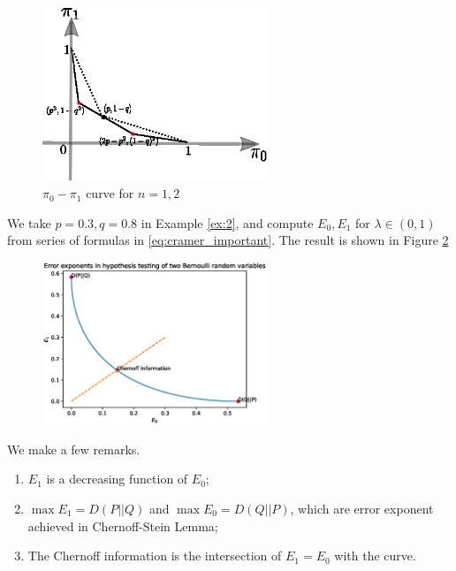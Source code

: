 \documentclass{article}
\begin{document}
\begin{figure}[!ht]
    \centering
    \includegraphics[width=0.6\textwidth]{pi0pi1_bern_2.eps}
    \caption{$\pi_0-\pi_1$ curve for $n=1,2$}
    \label{fig:pi0n2}
\end{figure}
We take $p=0.3,q=0.8$ in Example
\ref{ex:2}, and compute $E_0, E_1$ for
$\lambda \in (0,1)$ from series of formulas in 
\eqref{eq:cramer_important}. The result is shown
in Figure \ref{fig:trade}
\begin{figure}[!ht]
    \centering
    \includegraphics[width=0.6\textwidth]{trade_off.eps}
    \caption{}\label{fig:trade}
\end{figure}
We make a few remarks.
\begin{enumerate}
    \item $E_1$ is a decreasing function of $E_0$;
    \item $\max E_1 = D(P||Q)$ and $\max E_0 = D(Q||P)$,
    which are error exponent achieved in Chernoff-Stein Lemma;
    \item The Chernoff information is the intersection
    of $E_1=E_0$ with the curve.
\end{enumerate}
\end{document}
